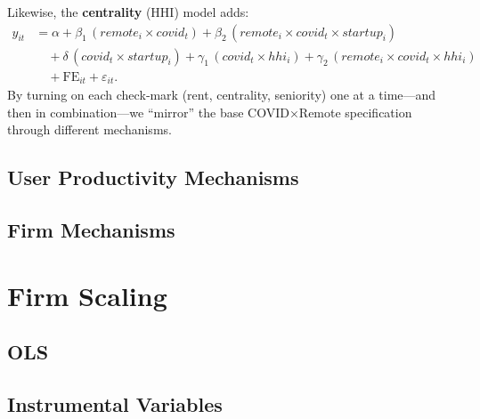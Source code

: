 \documentclass{article}
\newcommand{\cleanedresultsdir}{../results/cleaned}
\begin{document}
Likewise, the \textbf{centrality} (HHI) model adds:
\[
\begin{aligned}
y_{it} &= \alpha 
  + \beta_1\,(remote_i \times covid_t)
  + \beta_2\,(remote_i \times covid_t \times startup_i) \\
       &\quad
  + \delta\,(covid_t \times startup_i)
  + \gamma_1\,(covid_t \times hhi_i)
  + \gamma_2\,(remote_i \times covid_t \times hhi_i) \\
       &\quad
  + \mathrm{FE}_{it}
  + \varepsilon_{it}.
\end{aligned}
\]
By turning on each check‐mark (rent, centrality, seniority) one at a time—and
then in combination—we “mirror” the base COVID×Remote specification through
different mechanisms.



	\clearpage
	\begin{landscape}
	\subsection{User Productivity Mechanisms}
	
	\end{landscape}

\clearpage
\begin{landscape}
\subsection{Firm Mechanisms}

  \end{landscape}


\clearpage
\section{Firm Scaling}
\label{sec:firm_scaling}

\subsection{OLS}


\subsection{Instrumental Variables}

\end{document}
